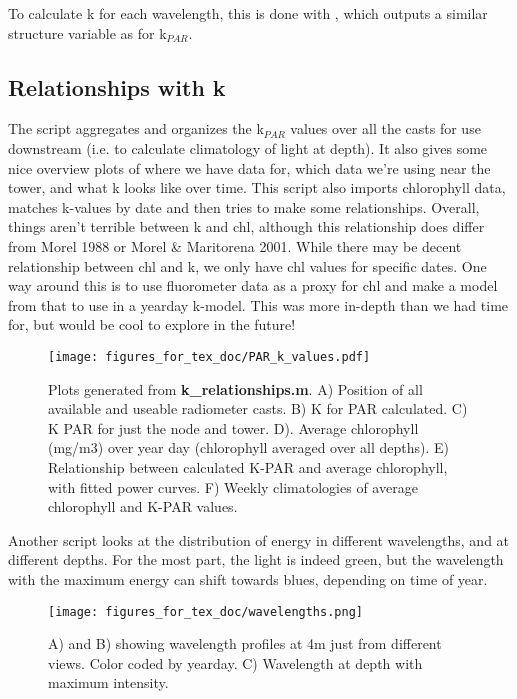 \documentclass[11pt]{article}
\begin{document}
To calculate k for each wavelength, this is done with , which outputs a similar structure variable as for k$_{PAR}$.





\subsection{Relationships with k}

The script  aggregates and organizes the k$_{PAR}$ values over all the casts for use downstream (i.e. to calculate climatology of light at depth). It also gives some nice overview plots of where we have data for, which data we're using near the tower, and what k looks like over time. This script also imports chlorophyll data, matches k-values by date and then tries to make some relationships. Overall, things aren't terrible between k and chl, although this relationship does differ from Morel 1988 or Morel \& Maritorena 2001. While there may be decent relationship between chl and k, we only have chl values for specific dates. One way around this is to use fluorometer data as a proxy for chl and make a model from that to use in a yearday k-model. This was more in-depth than we had time for, but would be cool to explore in the future!

 
 \begin{figure}[h]
\centering
\texttt{[image: figures\_for\_tex\_doc/PAR\_k\_values.pdf]}
\caption{Plots generated from \textbf{k\_relationships.m}. A) Position of all available and useable radiometer casts. B) K for PAR calculated. C) K PAR for just the node and tower. D). Average chlorophyll (mg/m3) over year day (chlorophyll averaged over all depths). E) Relationship between calculated K-PAR and average chlorophyll, with fitted power curves. F) Weekly climatologies of average chlorophyll and K-PAR values.}
\end{figure}

\clearpage

Another script  looks at the distribution of energy in different wavelengths, and at different depths. For the most part, the light is indeed green, but the wavelength with the maximum energy can shift towards blues, depending on time of year. 

 \begin{figure}[h]
\centering
\texttt{[image: figures\_for\_tex\_doc/wavelengths.png]}
\caption{A) and B) showing wavelength profiles at 4m just from different views. Color coded by yearday. C) Wavelength at depth with maximum intensity.}
\end{figure}
\end{document}
